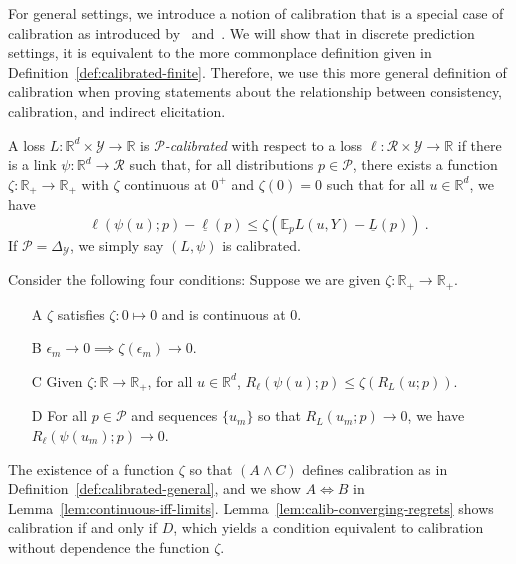 \documentclass[anon,12pt]{colt2021} %
\newcommand{\Comments}{1}
\newcommand{\mytodo}[2]{\ifnum\Comments=1%
	\todo[linecolor=#1!80!black,backgroundcolor=#1,bordercolor=#1!80!black]{#2}\fi}
\newcommand{\jessiet}[1]{\mytodo{purple!20!white}{JF: #1}}
\newcommand{\reals}{\mathbb{R}}
\newcommand{\simplex}{\Delta_\Y}
\newcommand{\E}{\mathbb{E}}
\newcommand{\R}{\mathcal{R}}
\renewcommand{\P}{\mathcal{P}}
\newcommand{\Y}{\mathcal{Y}}
\newcommand{\exploss}[3]{\E_{#3} #1(#2,Y)}
\newcommand{\risk}[1]{\underline{#1}}
\begin{document}
For general settings, we introduce a notion of calibration that is a special case of calibration as introduced by~\citet[Definition 2.7]{steinwart2007compare} and~\citet[Chapter 3]{steinwart2008support}. 
We will show that in discrete prediction settings, it is equivalent to the more commonplace definition given in Definition~\ref{def:calibrated-finite}.
Therefore, we use this more general definition of calibration when proving statements about the relationship between consistency, calibration, and indirect elicitation.

\begin{definition}\label{def:calibrated-general}
	A loss $L:\reals^d \times \Y \to \reals$ is \emph{$\P$-calibrated} with respect to a loss $\ell : \R \times \Y \to \reals$ if there is a link $\psi : \reals^d \to \R$ such that, for all distributions $p \in \P$, there exists a function $\zeta : \reals_+ \to \reals_+$ with $\zeta$ continuous at $0^+$ and $\zeta(0) = 0$ such that for all $u \in \reals^d$, we have
	\begin{equation}\label{eq:calibrated-general}
	\ell( \psi(u); p) - \risk{\ell}(p)  \leq \zeta \left(  \exploss{L}{u}{p} - \risk{L}(p) \right)~.~
	\end{equation}
	If $\P = \simplex$, we simply say $(L, \psi)$ is calibrated.
\end{definition}

Consider the following four conditions: Suppose we are given $\zeta:\reals_+ \to \reals_+$.
\begin{enumerate}
	\item [A] $\zeta$ satisfies $\zeta : 0 \mapsto 0$ and is continuous at $0$.
	\item [B] $\epsilon_m \to 0 \implies \zeta(\epsilon_m) \to 0$.
	\item [C] Given $\zeta:\reals \to \reals_+$, for all $u \in \reals^d$, $R_\ell(\psi(u); p) \leq \zeta(R_L(u;p))$.
	\item [D] For all $p \in \P$ and sequences $\{u_m\}$ so that $R_L(u_m; p) \to 0$, we have $R_\ell(\psi(u_m); p) \to 0$.
\end{enumerate}
The existence of a function $\zeta$ so that $(A \wedge C)$ defines calibration as in Definition~\ref{def:calibrated-general}, and we show $A \iff B$ in Lemma~\ref{lem:continuous-iff-limits}.  
Lemma~\ref{lem:calib-converging-regrets} shows calibration if and only if $D$, which yields a condition equivalent to calibration without dependence the function $\zeta$.
\end{document}
